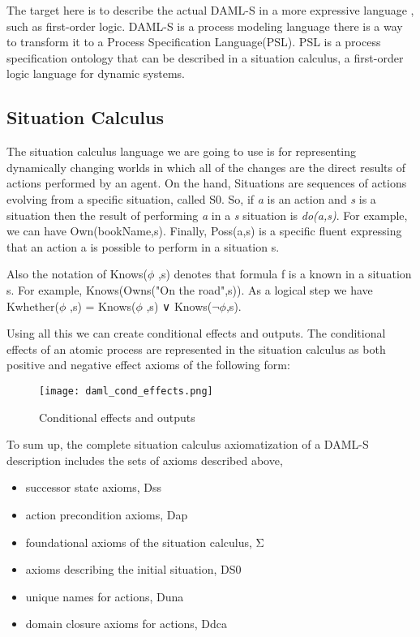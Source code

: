 The target here is to describe the actual DAML-S in a more expressive language , such as first-order logic. DAML-S is a process modeling language there is a way to transform it to a Process Specification Language(PSL). PSL is a process specification ontology  that can be described in a situation calculus, a first-order logic language for dynamic systems.

\subsection*{Situation Calculus}
The situation calculus language we are going to use is for representing dynamically changing worlds in which all of the changes are the direct results of actions performed by an agent. On the hand, Situations are sequences of actions evolving from a specific situation, called S0. So, if \emph{a} is an action and \emph{s} is a situation then the result of performing \emph{a} in a \emph{s} situation is \emph{do(a,s)}. For example, we can have Own(bookName,s).
Finally, Poss(a,s) is a specific fluent expressing that an action a is possible to perform in a situation s.

Also the notation of Knows($\phi$ ,s) denotes that formula f is a known in a situation s. For example, Knows(Owns("On the road",s)). As a logical step we have Kwhether($\phi$ ,s) = Knows($\phi$ ,s) ∨ Knows($\neg\phi$,s).

Using all this we can create conditional effects and outputs. The conditional effects of an atomic process are represented in the situation calculus as both positive and negative effect axioms of the following form:

\begin{figure}[t]
    \centering
    \texttt{[image: daml\_cond\_effects.png]}
    \caption{Conditional effects and outputs}
    \label{fig:Conditional effects and outputs}
\end{figure}

To sum up, the complete situation calculus axiomatization of a DAML-S description includes the sets of axioms described above,
\begin{itemize}
    \item successor state axioms, Dss
    \item action precondition axioms, Dap
    \item foundational axioms of the situation calculus, Σ
    \item axioms describing the initial situation, DS0
    \item unique names for actions, Duna
    \item domain closure axioms for actions, Ddca
\end{itemize}

